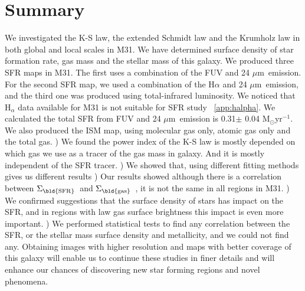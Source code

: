 \documentclass[useAMS,usenatbib]{mn2e}
\newcommand \sigmagas    {$\Sigma_{\rm \bld {gas }} $\ }
\newcommand \sigmasfr     {$\Sigma_{\rm \bld {SFR }} $\ }
\newcommand \um    {$\mu$m\ }
\begin{document}
\section{Summary}
 We investigated the K-S law, the extended Schmidt law and the Krumholz law in both global and local scales in M31. We have determined surface density of star formation rate, gas mass and the stellar mass of this galaxy. We produced three SFR maps in M31. The first uses a combination of the FUV and 24 \um emission. For the second SFR map, we used a combination of the H$\alpha$ and 24 \um emission, and the third one was produced using total-infrared luminosity. We noticed that H$_\alpha$ data available for M31 is not suitable for SFR study ~\ref{app:halpha}. We calculated the total SFR from FUV and 24 \um emission is 0.31$\pm$ 0.04 M$_{\odot}$yr$^{-1}$. We also produced the ISM map, using molecular gas only, atomic gas only and the total gas.
) We found the power index of the K-S law is mostly depended on which gas we use as a tracer of the gas mass in galaxy. And it is mostly independent of the SFR tracer.
) We showed that, using different fitting methods gives us different results
) Our results showed although there is a correlation between \sigmasfr and \sigmagas, it is not the same in all regions in M31. 
) We confirmed \cite{Shi11} suggestions that the surface density of stars has impact on the SFR, and in regions with law gas surface brightness this impact is even more important. 
) We performed statistical tests to find any correlation between the SFR, or the stellar mass surface density and metallicity, and we could not find any.
\newline
Obtaining images with higher resolution and maps with better coverage of this galaxy will enable us to continue these studies in finer details and will enhance our chances of discovering new star forming regions and novel phenomena.
\end{document}
